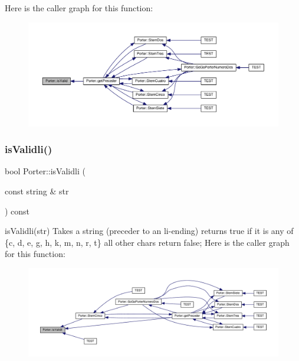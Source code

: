 Here is the caller graph for this function\+:
\nopagebreak
\begin{figure}[H]
\begin{center}
\leavevmode
\includegraphics[width=350pt]{class_porter_a9da79dd6524131e703619d3e301e896a_icgraph}
\end{center}
\end{figure}
\mbox{\label{class_porter_ac53ad85d5d3178b72178a4d89137b55e}} 
\subsubsection{\texorpdfstring{is\+Validli()}{isValidli()}}
{\footnotesize\ttfamily bool Porter\+::is\+Validli (\begin{DoxyParamCaption}\item[{const string \&}]{str }\end{DoxyParamCaption}) const}

is\+Validli(str) Takes a string (preceder to an li-\/ending) returns true if it is any of \{\textquotesingle{}c\textquotesingle{}, \textquotesingle{}d\textquotesingle{}, \textquotesingle{}e\textquotesingle{}, \textquotesingle{}g\textquotesingle{}, \textquotesingle{}h\textquotesingle{}, \textquotesingle{}k\textquotesingle{}, \textquotesingle{}m\textquotesingle{}, \textquotesingle{}n\textquotesingle{}, \textquotesingle{}r\textquotesingle{}, \textquotesingle{}t\textquotesingle{}\} all other chars return false; Here is the caller graph for this function\+:
\nopagebreak
\begin{figure}[H]
\begin{center}
\leavevmode
\includegraphics[width=350pt]{class_porter_ac53ad85d5d3178b72178a4d89137b55e_icgraph}
\end{center}
\end{figure}
\mbox{\label{class_porter_ab16d2762c47b86b9a161be3d2c44203e}} 
